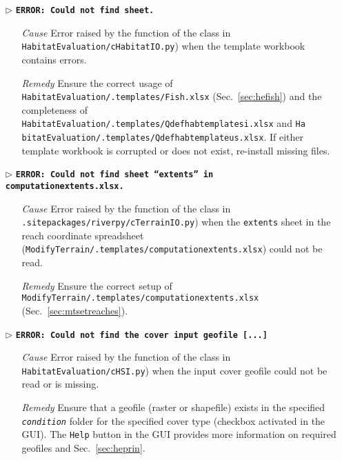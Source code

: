 \begin{itemize}
	\item[$\triangleright$]\textbf{\texttt{ERROR: Could not find sheet.}}
	\begin{itemize}
		\item[\textit{Cause}\hspace{0.27cm}] Error raised by the  function of the  class in \texttt{HabitatEvaluation/cHabitatIO.py}) when the template workbook contains errors.
		\item[\textit{Remedy}] Ensure the correct usage of \texttt{HabitatEvaluation/.templates/Fish.xlsx} (Sec.~\ref{sec:hefish}) and the completeness of \texttt{HabitatEvaluation/.templates/Q{\myUnderscore}def{\myUnderscore}hab{\myUnderscore}template{\myUnderscore}si.xlsx} and \texttt{Ha bitatEvaluation/.templates/Q{\myUnderscore}def{\myUnderscore}hab{\myUnderscore}template{\myUnderscore}us.xlsx}. If either template workbook is corrupted or does not exist, re-install missing files.\\
	\end{itemize}
	
	\item[$\triangleright$]\textbf{\texttt{ERROR: Could not find sheet ``extents'' in computation{\myUnderscore}extents.xlsx.}}
	\begin{itemize}
		\item[\textit{Cause}\hspace{0.27cm}] Error raised by the  function of the  class in \texttt{.site{\myUnderscore}packages/riverpy/cTerrainIO.py}) when the \texttt{extents} sheet in the reach coordinate spreadsheet (\texttt{ModifyTerrain/.templates/computation{\myUnderscore}extents.xlsx}) could not be read.
		\item[\textit{Remedy}] Ensure the correct setup of \texttt{ModifyTerrain/.templates/computation{\myUnderscore}extents.xlsx}\\   (Sec.~\ref{sec:mtsetreaches}).\\
	\end{itemize}
	
	\item[$\triangleright$]\textbf{\texttt{ERROR: Could not find the cover input geofile [...]}}
	\begin{itemize}
		\item[\textit{Cause}\hspace{0.27cm}] Error raised by the  function of the  class in \texttt{HabitatEvaluation/cHSI.py}) when the input cover geofile could not be read or is missing.
		\item[\textit{Remedy}] Ensure that a geofile (raster or shapefile) exists in the specified \texttt{\textit{condition}} folder for the specified cover type (checkbox activated in the GUI). The \texttt{Help} button in the GUI provides more information on required geofiles and Sec.~\ref{sec:heprin}.\\
	\end{itemize}
	

\end{itemize}
